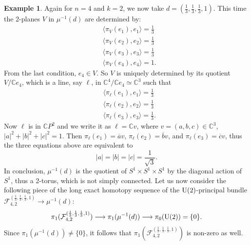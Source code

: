 \documentclass[12pt]{amsart}
\theoremstyle{definition}
\newtheorem{ex}[thm]{Example}
\theoremstyle{remark}
\newcommand{\CC}{\mathbb C}
\begin{document}
\begin{ex} Again for $n=4$ and $k=2$, we now take $d=(\frac{1}{3},\frac{1}{3},\frac{1}{3},1)$. This time the 2-planes $V$ in $\mu^{-1}(d)$ are determined by:
\begin{align*}
{}& \langle \pi_V(e_1), e_1 \rangle =\frac{1}{3}\\
 {}& \langle \pi_V(e_2), e_2 \rangle =\frac{1}{3}\\
 {}& \langle \pi_V(e_3), e_3 \rangle =\frac{1}{3}\\
 {}& \langle \pi_V(e_4), e_4 \rangle =1.
 \end{align*}
 From the last condition, $e_4\in V$. So $V$ is uniquely determined by its quotient $V/ \CC e_4$,
 which is a line, say $\ell$, in $\CC^4/ \CC e_4 \simeq \CC^3$ such that
 \begin{align*}
 {}& \langle \pi_\ell(e_1), e_1 \rangle =\frac{1}{3}\\
 {}& \langle \pi_\ell(e_2), e_2 \rangle =\frac{1}{3}\\
 {}& \langle \pi_\ell(e_3), e_3\rangle =\frac{1}{3}.
 \end{align*}
 Now $\ell$ is in $\CC P^2$ and we write it as $\ell = \CC v$, where $v=(a,b,c)\in \CC^3$, $|a|^2+|b|^2+|c|^2=1$. 
 Then $\pi_\ell (e_1)=\overline{a}v$, $\pi_\ell(e_2)=\overline{b}v$, and $\pi_\ell (e_3)=\overline{c}v$,
 thus the three equations above are equivalent to
 $$|a|=|b|=|c|=\frac{1}{\sqrt{3}}.$$ In conclusion, $\mu^{-1}(d)$ is the quotient of $S^1\times S^1\times S^1$ by the diagonal action of $S^1$, thus a 2-torus, which is not simply connected.  
 Let us now consider the following piece of the long exact homotopy sequence of the ${\rm U}(2)$-principal bundle
 ${\mathcal F}_{4,2}^{(\frac{1}{3}, \frac{1}{3}, \frac{1}{3},1)} \to \mu^{-1}(d)$: 
 $$  \pi_1({\mathcal F}_{4,2}^{(\frac{1}{3}, \frac{1}{3}, \frac{1}{3},1)}) \longrightarrow \pi_1(\mu^{-1}(d))\longrightarrow \pi_0({\rm U}(2))=\{0\}.$$
 Since $ \pi_1(\mu^{-1}(d)) \neq \{0\}$, it follows that  $\pi_1({\mathcal F}_{4,2}^{(\frac{1}{3}, \frac{1}{3}, \frac{1}{3},1)})$ is non-zero as well.  
\end{ex}
\end{document}
